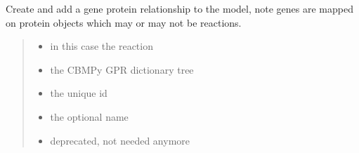 \documentclass[letterpaper,12pt,english]{sphinxmanual}
\begin{document}
\begin{fulllineitems}
\begin{fulllineitems}
\begin{quote}
\begin{description}
\begin{itemize}
\end{itemize}

\end{description}\end{quote}

\end{fulllineitems}


\begin{fulllineitems}
\label{\detokenize{api/core:cbmpy.CBModel.Model.createGeneProteinAssociationFromTree}}
\pysigstartsignatures
\pysiglinewithargsret
{}
{\sphinxparamcomma {}\sphinxparamcomma {}\sphinxparamcomma {}\sphinxparamcomma {}\sphinxparamcomma {}\sphinxparamcomma {}}
{}
\pysigstopsignatures
\sphinxAtStartPar
Create and add a gene protein relationship to the model, note genes are mapped on protein objects which may or may not be reactions.
\begin{quote}\begin{description}
\begin{itemize}
\item {} 
\sphinxAtStartPar
{} \textendash{} in this case the reaction

\item {} 
\sphinxAtStartPar
{} \textendash{} the CBMPy GPR dictionary tree

\item {} 
\sphinxAtStartPar
{} \textendash{} the unique id

\item {} 
\sphinxAtStartPar
{} \textendash{} the optional name

\item {} 
\sphinxAtStartPar
{} \textendash{} deprecated, not needed anymore


\end{itemize}
\end{description}
\end{quote}
\end{fulllineitems}
\end{fulllineitems}
\end{document}
